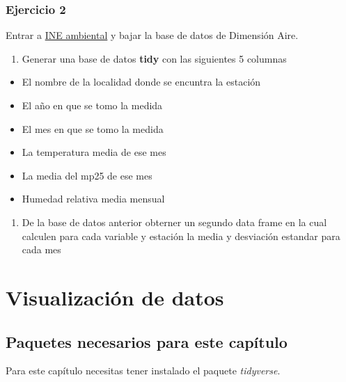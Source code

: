 \documentclass[]{book}
\providecommand{\tightlist}{%
  \setlength{\itemsep}{0pt}\setlength{\parskip}{0pt}}
\begin{document}
\hypertarget{ejercicio-2-1}{%
\subsection{Ejercicio 2}\label{ejercicio-2-1}}

Entrar a
\href{http://www.ine.cl/estadisticas/medioambiente/series-cronologicas-vba}{INE
ambiental} y bajar la base de datos de Dimensión Aire.

\begin{enumerate}
\def\labelenumi{\alph{enumi}.}
\tightlist
\item
  Generar una base de datos \textbf{tidy} con las siguientes 5 columnas
\end{enumerate}

\begin{itemize}
\tightlist
\item
  El nombre de la localidad donde se encuntra la estación
\item
  El año en que se tomo la medida
\item
  El mes en que se tomo la medida
\item
  La temperatura media de ese mes
\item
  La media del mp25 de ese mes
\item
  Humedad relativa media mensual
\end{itemize}

\begin{enumerate}
\def\labelenumi{\alph{enumi}.}
\setcounter{enumi}{1}
\tightlist
\item
  De la base de datos anterior obterner un segundo data frame en la cual
  calculen para cada variable y estación la media y desviación estandar
  para cada mes
\end{enumerate}

\hypertarget{visualizacion}{%
\chapter{Visualización de datos}\label{visualizacion}}

\hypertarget{paquetes-necesarios-para-este-capitulo-3}{%
\section{Paquetes necesarios para este
capítulo}\label{paquetes-necesarios-para-este-capitulo-3}}

Para este capítulo necesitas tener instalado el paquete
\emph{tidyverse}.
\end{document}

